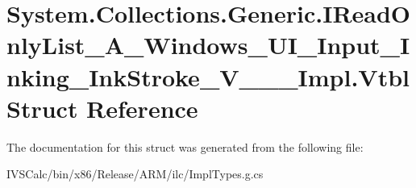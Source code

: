 \hypertarget{struct_system_1_1_collections_1_1_generic_1_1_i_read_only_list___a___windows___u_i___input___ink6ff2117d717405f6a2ae3f9871d32310}{}\section{System.\+Collections.\+Generic.\+I\+Read\+Only\+List\+\_\+\+A\+\_\+\+Windows\+\_\+\+U\+I\+\_\+\+Input\+\_\+\+Inking\+\_\+\+Ink\+Stroke\+\_\+\+V\+\_\+\+\_\+\+\_\+\+Impl.\+Vtbl Struct Reference}
\label{struct_system_1_1_collections_1_1_generic_1_1_i_read_only_list___a___windows___u_i___input___ink6ff2117d717405f6a2ae3f9871d32310}


The documentation for this struct was generated from the following file\+:\begin{DoxyCompactItemize}
\item 
I\+V\+S\+Calc/bin/x86/\+Release/\+A\+R\+M/ilc/Impl\+Types.\+g.\+cs\end{DoxyCompactItemize}
